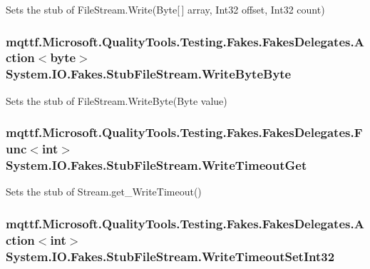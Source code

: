 Sets the stub of File\-Stream.\-Write(\-Byte\mbox{[}$\,$\mbox{]} array, Int32 offset, Int32 count)

\hypertarget{class_system_1_1_i_o_1_1_fakes_1_1_stub_file_stream_adb9297cbbb6d37a63d6e249151558f2c}{
\subsubsection[{Write\-Byte\-Byte}]{\setlength{\rightskip}{0pt plus 5cm}mqttf.\-Microsoft.\-Quality\-Tools.\-Testing.\-Fakes.\-Fakes\-Delegates.\-Action$<$byte$>$ System.\-I\-O.\-Fakes.\-Stub\-File\-Stream.\-Write\-Byte\-Byte}}\label{class_system_1_1_i_o_1_1_fakes_1_1_stub_file_stream_adb9297cbbb6d37a63d6e249151558f2c}


Sets the stub of File\-Stream.\-Write\-Byte(\-Byte value)

\hypertarget{class_system_1_1_i_o_1_1_fakes_1_1_stub_file_stream_a4b441fd79ddf879f49ce1099548adbff}{
\subsubsection[{Write\-Timeout\-Get}]{\setlength{\rightskip}{0pt plus 5cm}mqttf.\-Microsoft.\-Quality\-Tools.\-Testing.\-Fakes.\-Fakes\-Delegates.\-Func$<$int$>$ System.\-I\-O.\-Fakes.\-Stub\-File\-Stream.\-Write\-Timeout\-Get}}\label{class_system_1_1_i_o_1_1_fakes_1_1_stub_file_stream_a4b441fd79ddf879f49ce1099548adbff}


Sets the stub of Stream.\-get\-\_\-\-Write\-Timeout()

\hypertarget{class_system_1_1_i_o_1_1_fakes_1_1_stub_file_stream_aad854f61a9ee54a9d4b9e9efedd20006}{
\subsubsection[{Write\-Timeout\-Set\-Int32}]{\setlength{\rightskip}{0pt plus 5cm}mqttf.\-Microsoft.\-Quality\-Tools.\-Testing.\-Fakes.\-Fakes\-Delegates.\-Action$<$int$>$ System.\-I\-O.\-Fakes.\-Stub\-File\-Stream.\-Write\-Timeout\-Set\-Int32}}\label{class_system_1_1_i_o_1_1_fakes_1_1_stub_file_stream_aad854f61a9ee54a9d4b9e9efedd20006}


